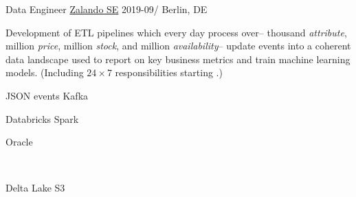 \documentclass[%
version=last,%
fontsize=11pt,%
paper=A4,%
areasetadvanced,%
headinclude=false,%
footinclude=false,%
headlines=0,%
footlines=0,%
toc=bibnumbered,%
]{scrartcl}
\begin{document}
\begin{minipage}[t]{0.575\textwidth}
  \vspace*{0cm}%
  \WorkEntry%
  {Data Engineer}%
  {\href{https://corporate.zalando.com/en}{Zalando SE}}%
  {2019-09/}%
  {Berlin, DE}%
  {%
    Development of ETL pipelines which every day process over\---
     thousand \emph{attribute},  million
    \emph{price},  million \emph{stock}, and
     million \emph{availability}\--- update events into a
    coherent data landscape used to report on key business metrics and train
    machine learning models.\newline%
    {\footnotesize (Including \(24 \times 7\) responsibilities starting
      .)}%
    \leavevmode\vspace*{20pt}\newline%
    \begingroup%
    \begin{minipage}{.2\linewidth}
      \begin{tcolorbox}[title=Nakadi,remember as=Kafka]
        JSON events%
        \tcblower%
        Kafka
      \end{tcolorbox}
    \end{minipage}%
    \hfill%
    \begin{minipage}{.2\linewidth}
      \begin{tcolorbox}[title=AWS,remember as=Spark]
        Databricks%
        \tcblower%
        Spark
      \end{tcolorbox}%
    \end{minipage}%
    \hfill%
    \begin{minipage}{.2\linewidth}
      \begin{tcolorbox}[remember as=Oracle]
        Oracle
      \end{tcolorbox}%
      \\%
      \begin{tcolorbox}[remember as=S3]
        Delta Lake%
        \tcblower%
        S3
      \end{tcolorbox}

\end{minipage}}
\end{minipage}
\end{document}
